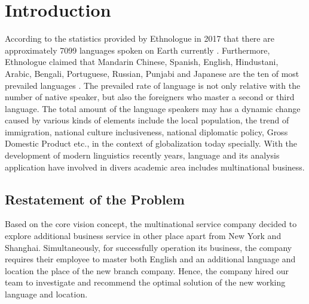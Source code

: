 \documentclass{mcmthesis}
\begin{document}
\section{Introduction}
According to the statistics provided by Ethnologue \cite{1} in 2017 that there are approximately 7099 languages spoken on Earth currently \cite{2}. Furthermore, Ethnologue claimed that Mandarin Chinese, Spanish, English, Hindustani, Arabic, Bengali, Portuguese, Russian, Punjabi and Japanese are the ten of most prevailed languages \cite{2}. The prevailed rate of language is not only relative with the number of native speaker, but also the foreigners who master a second or third language. The total amount of the language speakers may has a dynamic change caused by various kinds of elements include the local population, the trend of immigration, national culture inclusiveness, national diplomatic policy, Gross Domestic Product etc., in the context of globalization today specially. With the development of modern linguistics recently years, language and its analysis application have involved in divers academic area includes multinational business.

\subsection{Restatement of the Problem}
Based on the core vision concept, the multinational service company decided to explore additional business service in other place apart from New York and Shanghai. Simultaneously, for successfully operation its business, the company requires their employee to master both English and an additional language and location the place of the new branch company. Hence, the company hired our team to investigate and recommend the optimal solution of the new working language and location.
\end{document}

